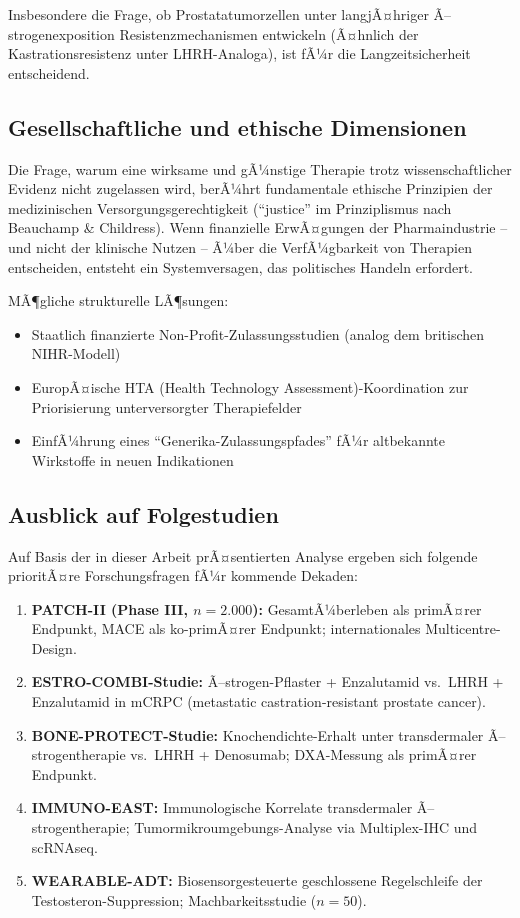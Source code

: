 ﻿\documentclass[a4paper,12pt]{article}
\theoremstyle{definition}
\begin{document}
Insbesondere die Frage, ob Prostatatumorzellen unter langjÃ¤hriger Ã–strogenexposition Resistenzmechanismen entwickeln (Ã¤hnlich der Kastrationsresistenz unter LHRH-Analoga), ist fÃ¼r die Langzeitsicherheit entscheidend.

\subsection{Gesellschaftliche und ethische Dimensionen}

Die Frage, warum eine wirksame und gÃ¼nstige Therapie trotz wissenschaftlicher Evidenz nicht zugelassen wird, berÃ¼hrt fundamentale ethische Prinzipien der medizinischen Versorgungsgerechtigkeit (``justice'' im Prinziplismus nach Beauchamp \& Childress).
Wenn finanzielle ErwÃ¤gungen der Pharmaindustrie -- und nicht der klinische Nutzen -- Ã¼ber die VerfÃ¼gbarkeit von Therapien entscheiden, entsteht ein Systemversagen, das politisches Handeln erfordert.

MÃ¶gliche strukturelle LÃ¶sungen:
\begin{itemize}
  \item Staatlich finanzierte Non-Profit-Zulassungsstudien (analog dem britischen NIHR-Modell)
  \item EuropÃ¤ische HTA (Health Technology Assessment)-Koordination zur Priorisierung unterversorgter Therapiefelder
  \item EinfÃ¼hrung eines ``Generika-Zulassungspfades'' fÃ¼r altbekannte Wirkstoffe in neuen Indikationen
\end{itemize}

\subsection{Ausblick auf Folgestudien}

Auf Basis der in dieser Arbeit prÃ¤sentierten Analyse ergeben sich folgende prioritÃ¤re Forschungsfragen fÃ¼r kommende Dekaden:

\begin{enumerate}
  \item \textbf{PATCH-II (Phase III, $n = 2.000$):} GesamtÃ¼berleben als primÃ¤rer Endpunkt, MACE als ko-primÃ¤rer Endpunkt; internationales Multicentre-Design.
  \item \textbf{ESTRO-COMBI-Studie:} Ã–strogen-Pflaster + Enzalutamid vs.\ LHRH + Enzalutamid in mCRPC (metastatic castration-resistant prostate cancer).
  \item \textbf{BONE-PROTECT-Studie:} Knochendichte-Erhalt unter transdermaler Ã–strogen\-therapie vs.\ LHRH + Denosumab; DXA-Messung als primÃ¤rer Endpunkt.
  \item \textbf{IMMUNO-EAST:} Immunologische Korrelate transdermaler Ã–strogentherapie; Tumormikroumgebungs-Analyse via Multiplex-IHC und scRNAseq.
  \item \textbf{WEARABLE-ADT:} Biosensorgesteuerte geschlossene Regelschleife der Testosteron-Suppression; Machbarkeitsstudie ($n = 50$).
\end{enumerate}
\end{document}
